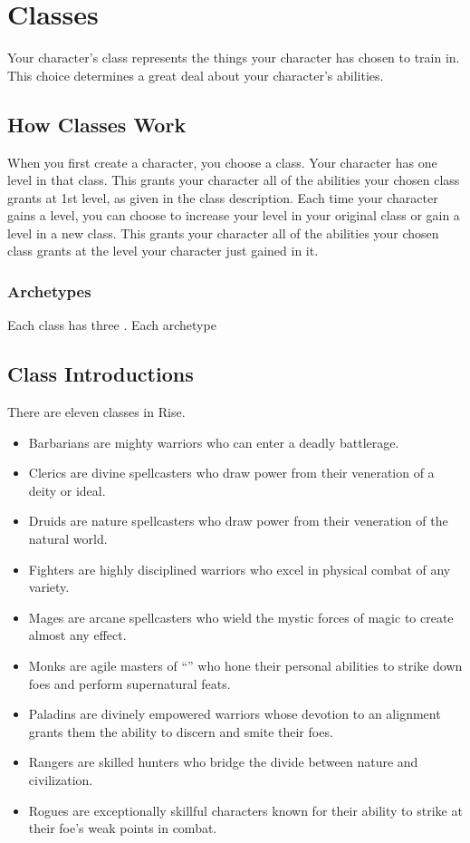 \chapter{Classes}\label{Classes}

Your character's class represents the things your character has chosen to train in.
This choice determines a great deal about your character's abilities.

\section{How Classes Work}
    When you first create a character, you choose a class.
    Your character has one level in that class.
    This grants your character all of the abilities your chosen class grants at 1st level, as given in the class description.
    Each time your character gains a level, you can choose to increase your level in your original class or gain a level in a new class.
    This grants your character all of the abilities your chosen class grants at the level your character just gained in it.

    \subsection{Archetypes}
        Each class has three .
        Each archetype 

\section{Class Introductions}

    There are eleven classes in Rise.
    \begin{itemize}
        \item Barbarians are mighty warriors who can enter a deadly battlerage.
        \item Clerics are divine spellcasters who draw power from their veneration of a deity or ideal.
        \item Druids are nature spellcasters who draw power from their veneration of the natural world.
        \item Fighters are highly disciplined warriors who excel in physical combat of any variety.
        \item Mages are arcane spellcasters who wield the mystic forces of magic to create almost any effect.
        \item Monks are agile masters of ``\ki'' who hone their personal abilities to strike down foes and perform supernatural feats.
        \item Paladins are divinely empowered warriors whose devotion to an alignment grants them the ability to discern and smite their foes.
        \item Rangers are skilled hunters who bridge the divide between nature and civilization.
        \item Rogues are exceptionally skillful characters known for their ability to strike at their foe's weak points in combat.
    \end{itemize}


